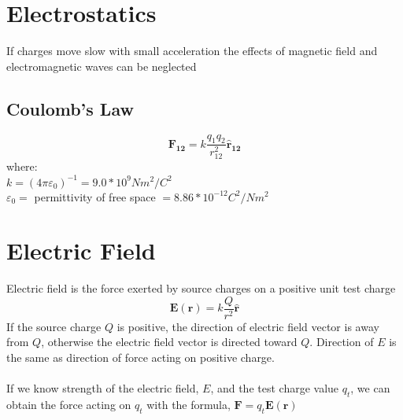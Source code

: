 \documentclass{article}
\begin{document}
\section*{Electrostatics}

If charges move slow with small acceleration the effects of magnetic field and electromagnetic
waves can be neglected
\subsection*{Coulomb's Law}
\[\pmb{F_{12}}=k\frac{q_1 q_2}{r_{12}^2}\pmb{\hat{r}_{12}}\]
where: \\
$k={(4\pi\varepsilon_0)}^{-1}=9.0*10^9 N m^2 / C^2$ \\
$\varepsilon_0=$ permittivity of free space $= 8.86 * 10^{-12} C^2 / N m^2$

\section*{Electric Field}
Electric field is the force exerted by source charges on a positive unit test charge
\[\pmb{E(r)}=k\frac{Q}{r^2}\pmb{\hat{r}}\]
If the source charge $Q$ is positive, the direction of electric field vector is away from $Q$,
otherwise the electric field vector is directed toward $Q$. Direction of $E$ is the same as
direction of force acting on positive charge. \\ \\
If we know strength of the electric field, $E$, and the test charge value $q_t$, we can obtain the
force acting on $q_t$ with the formula, $\pmb{F} = q_t \pmb{E(r)}$
\end{document}
